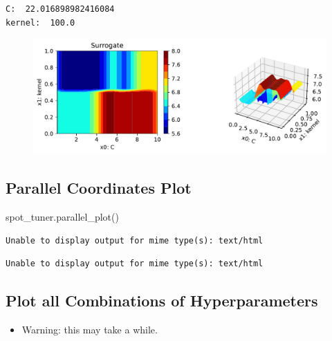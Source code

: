\documentclass[
  letterpaper,
  DIV=11,
  numbers=noendperiod]{scrreprt}
\newenvironment{Shaded}{\begin{snugshade}}{\end{snugshade}}
\newcommand{\NormalTok}[1]{\textcolor[rgb]{0.00,0.23,0.31}{#1}}
\providecommand{\tightlist}{%
  \setlength{\itemsep}{0pt}\setlength{\parskip}{0pt}}\usepackage{longtable,booktabs,array}
\begin{document}
\begin{verbatim}
C:  22.016898982416084
kernel:  100.0
\end{verbatim}

\begin{figure}[H]

{\centering \includegraphics{10_spot_hpt_sklearn_classification_files/figure-pdf/cell-34-output-2.pdf}

}

\end{figure}

\hypertarget{parallel-coordinates-plot}{%
\subsection{Parallel Coordinates Plot}\label{parallel-coordinates-plot}}

\begin{Shaded}
\begin{Highlighting}[]
\NormalTok{spot\_tuner.parallel\_plot()}
\end{Highlighting}
\end{Shaded}

\begin{verbatim}
Unable to display output for mime type(s): text/html
\end{verbatim}

\begin{verbatim}
Unable to display output for mime type(s): text/html
\end{verbatim}

\hypertarget{plot-all-combinations-of-hyperparameters}{%
\subsection{Plot all Combinations of
Hyperparameters}\label{plot-all-combinations-of-hyperparameters}}

\begin{itemize}
\tightlist
\item
  Warning: this may take a while.
\end{itemize}
\end{document}
